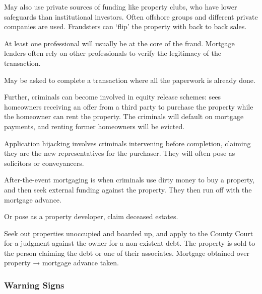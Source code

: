 \documentclass[
]{article}
\begin{document}
May also use private sources of funding like property clubs, who have
lower safeguards than institutional investors. Often offshore groups and
different private companies are used. Fraudsters can `flip' the property
with back to back sales.

At least one professional will usually be at the core of the fraud.
Mortgage lenders often rely on other professionals to verify the
legitimacy of the transaction.

May be asked to complete a transaction where all the paperwork is
already done.

Further, criminals can become involved in equity release schemes: sees
homeowners receiving an offer from a third party to purchase the
property while the homeowner can rent the property. The criminals will
default on mortgage payments, and renting former homeowners will be
evicted.

Application hijacking involves criminals intervening before completion,
claiming they are the new representatives for the purchaser. They will
often pose as solicitors or conveyancers.

After-the-event mortgaging is when criminals use dirty money to buy a
property, and then seek external funding against the property. They then
run off with the mortgage advance.

Or pose as a property developer, claim deceased estates.

Seek out properties unoccupied and boarded up, and apply to the County
Court for a judgment against the owner for a non-existent debt. The
property is sold to the person claiming the debt or one of their
associates. Mortgage obtained over property → mortgage advance taken.

\hypertarget{warning-signs}{%
\subsubsection{Warning Signs}\label{warning-signs}}
\end{document}
